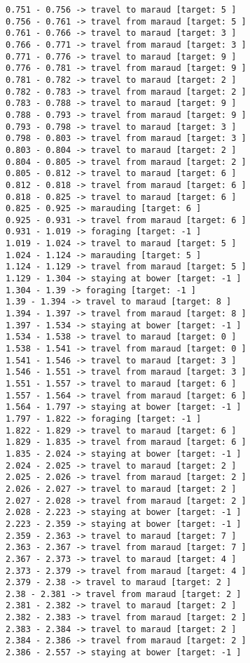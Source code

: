 \documentclass[11pt]{article}
\begin{document}
\begin{Verbatim}[commandchars=\\\{\}]
0.751 - 0.756 -> travel to maraud [target: 5 ]
0.756 - 0.761 -> travel from maraud [target: 5 ]
0.761 - 0.766 -> travel to maraud [target: 3 ]
0.766 - 0.771 -> travel from maraud [target: 3 ]
0.771 - 0.776 -> travel to maraud [target: 9 ]
0.776 - 0.781 -> travel from maraud [target: 9 ]
0.781 - 0.782 -> travel to maraud [target: 2 ]
0.782 - 0.783 -> travel from maraud [target: 2 ]
0.783 - 0.788 -> travel to maraud [target: 9 ]
0.788 - 0.793 -> travel from maraud [target: 9 ]
0.793 - 0.798 -> travel to maraud [target: 3 ]
0.798 - 0.803 -> travel from maraud [target: 3 ]
0.803 - 0.804 -> travel to maraud [target: 2 ]
0.804 - 0.805 -> travel from maraud [target: 2 ]
0.805 - 0.812 -> travel to maraud [target: 6 ]
0.812 - 0.818 -> travel from maraud [target: 6 ]
0.818 - 0.825 -> travel to maraud [target: 6 ]
0.825 - 0.925 -> marauding [target: 6 ]
0.925 - 0.931 -> travel from maraud [target: 6 ]
0.931 - 1.019 -> foraging [target: -1 ]
1.019 - 1.024 -> travel to maraud [target: 5 ]
1.024 - 1.124 -> marauding [target: 5 ]
1.124 - 1.129 -> travel from maraud [target: 5 ]
1.129 - 1.304 -> staying at bower [target: -1 ]
1.304 - 1.39 -> foraging [target: -1 ]
1.39 - 1.394 -> travel to maraud [target: 8 ]
1.394 - 1.397 -> travel from maraud [target: 8 ]
1.397 - 1.534 -> staying at bower [target: -1 ]
1.534 - 1.538 -> travel to maraud [target: 0 ]
1.538 - 1.541 -> travel from maraud [target: 0 ]
1.541 - 1.546 -> travel to maraud [target: 3 ]
1.546 - 1.551 -> travel from maraud [target: 3 ]
1.551 - 1.557 -> travel to maraud [target: 6 ]
1.557 - 1.564 -> travel from maraud [target: 6 ]
1.564 - 1.797 -> staying at bower [target: -1 ]
1.797 - 1.822 -> foraging [target: -1 ]
1.822 - 1.829 -> travel to maraud [target: 6 ]
1.829 - 1.835 -> travel from maraud [target: 6 ]
1.835 - 2.024 -> staying at bower [target: -1 ]
2.024 - 2.025 -> travel to maraud [target: 2 ]
2.025 - 2.026 -> travel from maraud [target: 2 ]
2.026 - 2.027 -> travel to maraud [target: 2 ]
2.027 - 2.028 -> travel from maraud [target: 2 ]
2.028 - 2.223 -> staying at bower [target: -1 ]
2.223 - 2.359 -> staying at bower [target: -1 ]
2.359 - 2.363 -> travel to maraud [target: 7 ]
2.363 - 2.367 -> travel from maraud [target: 7 ]
2.367 - 2.373 -> travel to maraud [target: 4 ]
2.373 - 2.379 -> travel from maraud [target: 4 ]
2.379 - 2.38 -> travel to maraud [target: 2 ]
2.38 - 2.381 -> travel from maraud [target: 2 ]
2.381 - 2.382 -> travel to maraud [target: 2 ]
2.382 - 2.383 -> travel from maraud [target: 2 ]
2.383 - 2.384 -> travel to maraud [target: 2 ]
2.384 - 2.386 -> travel from maraud [target: 2 ]
2.386 - 2.557 -> staying at bower [target: -1 ]

\end{Verbatim}
\end{document}
